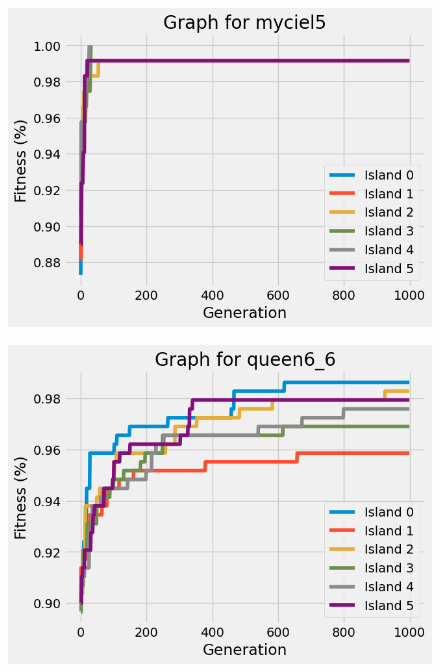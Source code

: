 \documentclass{article}
\begin{document}
\begin{multicols}{2}
\begin{figure}[H]
\end{figure}
\begin{figure}[H]
    \centering
    \includegraphics[scale=0.45]{imgs/convergence/myciel5_evolution.png}
\end{figure}
\begin{figure}[H]
    \centering
    \includegraphics[scale=0.45]{imgs/convergence/queen6_6_evolution.png}
\end{figure}
\begin{figure}[H]
    \centering

\end{figure}
\end{multicols}
\end{document}
